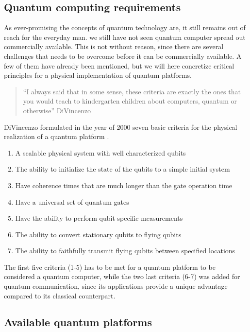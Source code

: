 \subsection{Quantum computing requirements}
As ever-promising the concepts of quantum technology are, it still remains out of reach for the everyday man. we still have not seen quantum computer spread out commercially available. This is not without reason, since there are several challenges that needs to be overcome before it can be commercially available. A few of them have already been mentioned, but we will here concretize critical principles for a physical implementation of quantum platforms.

\begin{quote}
   ``I always said that in some sense, these criteria are exactly the ones that you would teach to kindergarten children about computers, quantum or otherwise'' DiVincenzo \cite{Georgescu2020}
\end{quote}

DiVincenzo formulated in the year of 2000 seven basic criteria for the physical realization of a quantum platform \cite{DiVincenzo2000}.

\begin{enumerate}
  \item A scalable physical system with well characterized qubits
  \item The ability to initialize the state of the qubits to a simple initial system
  \item Have coherence times that are much longer than the gate operation time
  \item Have a universal set of quantum gates
  \item Have the ability to perform qubit-specific measurements
  \item The ability to convert stationary qubits to flying qubits
  \item The ability to faithfully transmit flying qubits between specified locations
\end{enumerate}

The first five criteria (1-5) has to be met for a quantum platform to be considered a quantum computer, while the two last criteria (6-7) was added for quantum communication, since its applications provide a unique advantage compared to its classical counterpart.

\subsection{Available quantum platforms}

